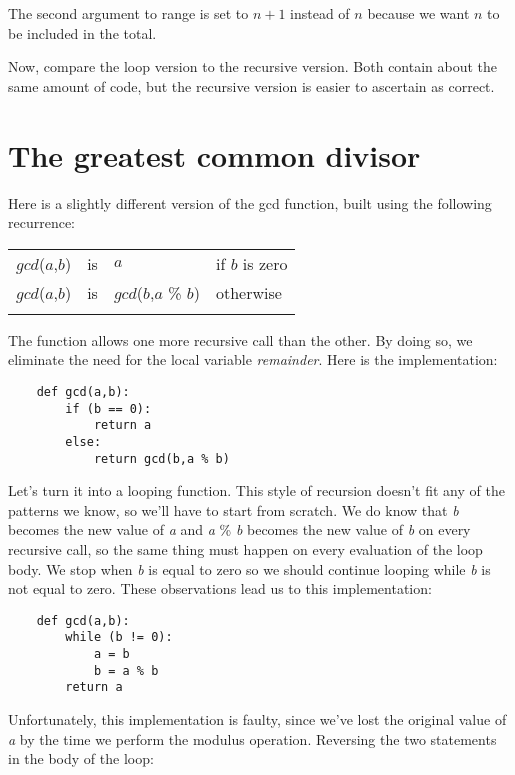 The second argument to range is set to $n+1$ instead of $n$ because
we want $n$ to be included in the total.

Now, compare the loop version to the recursive version. Both contain
about the same amount of code, but the recursive version is easier
to ascertain as correct.

\section{The greatest common divisor }

Here is a slightly different version of the gcd function, built using
the following recurrence:

\begin{center}
\begin{tabular}{lcll}%
\T\toprule
    $gcd$($a$,$b$) & is & $a$ & if $b$ is zero\\
    $gcd$($a$,$b$) & is & $gcd$($b$,$a$ \% $b$) & otherwise \T\\
\T\bottomrule
\end{tabular}
\end{center}

The function allows one more recursive call than the other. By doing
so, we eliminate the need for the local variable {\it remainder}. Here is
the implementation:

\begin{verbatim}
    def gcd(a,b):
        if (b == 0):
            return a
        else:
            return gcd(b,a % b)
\end{verbatim}

Let's turn it into a looping function. This style of
recursion doesn't fit any of the patterns we know, so
we'll have to start from scratch. We do know that 
{\it b} becomes the new value of {\it a} and {\it a} \% {\it b} becomes 
the new value of {\it b}
on every recursive call,
so the same thing must happen on every evaluation of
the loop body.
We stop when {\it b} is equal to zero so we should continue looping
while {\it b} is  not equal to zero. These observations lead us
to this implementation:

\begin{verbatim}
    def gcd(a,b):
        while (b != 0):
            a = b
            b = a % b
        return a
\end{verbatim}

Unfortunately, this implementation is faulty, since we've lost
the original value of {\it a} by the time we perform the modulus 
operation. Reversing the two statements in the body of the loop:

